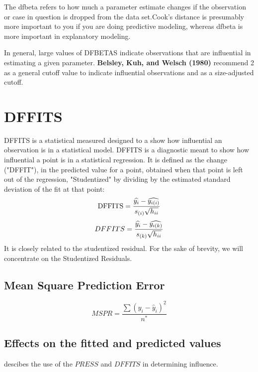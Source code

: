 \documentclass[12pt, a4paper]{report}
\theoremstyle{plain}
\theoremstyle{definition}
\theoremstyle{remark}
\begin{document}
The dfbeta refers to how much a parameter estimate changes if the observation or case in question is dropped from the data set.Cook's distance is presumably more important to you if you are doing predictive modeling, whereas dfbeta is more important in explanatory modeling.

In general, large values of DFBETAS indicate observations that are influential in estimating a given parameter. \textbf{Belsley, Kuh, and Welsch (1980)} recommend 2 as a general cutoff value to indicate influential observations and  as a size-adjusted cutoff.




\section{DFFITS} %
DFFITS is a statistical measured designed to a show how influential an observation is in a statistical model. DFFITS is a diagnostic meant to show how influential a point is in a statistical regression. It is defined as the change ("DFFIT"), in the predicted value for a point, obtained when that point is left out of the regression, "Studentized" by dividing by the estimated standard deviation of the fit at that point:
\[ \mbox{DFFITS} = {\widehat{y_i} - \widehat{y_{i(i)}} \over s_{(i)} \sqrt{h_{ii}}}\]
\begin{displaymath} DFFITS = {\widehat{y_i} -
	\widehat{y_{i(k)}} \over s_{(k)} \sqrt{h_{ii}}} \end{displaymath}
It is closely related to the studentized residual. For the sake of brevity, we will concentrate on the Studentized Residuals.

\subsection{Mean Square Prediction Error}
\begin{equation}
MSPR = \frac{\sum (y_{i}-\hat{y}_{i})^2}{n^*}
\end{equation}

\subsection{Effects on the fitted and predicted values}
\citet{schabenberger} descibes the use of the $PRESS$ and $DFFITS$ in determining influence.
\end{document}
